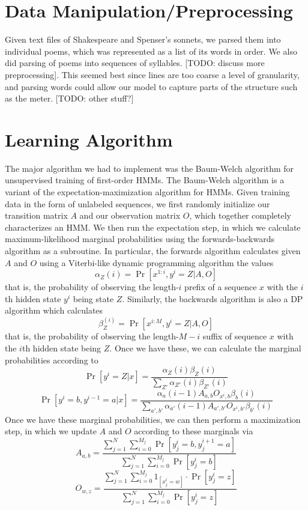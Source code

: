 \section{Data Manipulation/Preprocessing}
Given text files of Shakespeare and Spenser's sonnets, we parsed them into individual poems, which was represented as a list of its words in order. We also did parsing of poems into sequences of syllables. [TODO: discuss more preprocessing]. This seemed best since lines are too coarse a level of granularity, and parsing words could allow our model to capture parts of the structure such as the meter. [TODO: other stuff?]

\section{Learning Algorithm}
The major algorithm we had to implement was the Baum-Welch algorithm for unsupervised training of first-order HMMs. The Baum-Welch algorithm is a variant of the expectation-maximization algorithm for HMMs. Given training data in the form of unlabeled sequences, we first randomly initialize our transition matrix $A$ and our observation matrix $O$, which together completely characterizes an HMM. We then run the expectation step, in which we calculate maximum-likelihood marginal probabilities using the forwards-backwards algorithm as a subroutine. In particular, the forwards algorithm calculates given $A$ and $O$ using a Viterbi-like dynamic programming algorithm the values
$$\alpha_Z(i) = \Pr[x^{1 : i}, y^i = Z | A, O]$$
that is, the probability of observing the length-$i$ prefix of a sequence $x$ with the $i$th hidden state $y^i$ being state $Z$. Similarly, the backwards algorithm is also a DP algorithm which calculates
$$\beta_Z^(i) = \Pr[x^{i : M}, y^i = Z | A, O]$$
that is, the probability of observing the length-$M - i$ suffix of sequence $x$ with the $i$th hidden state being $Z$.
Once we have these, we can calculate the marginal probabilities according to
$$\Pr[y^i = Z | x] = \frac{\alpha_Z(i)\beta_Z(i)}{\sum_{Z'}{\alpha_{Z'}(i)\beta_{Z'}(i)}}$$
$$\Pr[y^i = b, y^{i - 1} = a | x] = \frac{\alpha_a(i - 1)A_{a, b}O_{x^i, b}\beta_b(i)}{\sum_{a', b'}{\alpha_{a'}(i - 1)A_{a', b'}O_{x^i, b'}\beta_{b'}(i)}}$$
Once we have these marginal probabilities, we can then perform a maximization step, in which we update $A$ and $O$ according to these marginals via
$$A_{a, b} = \frac{\sum_{j = 1}^{N}{\sum_{i = 0}^{M_j}{\Pr[y_j^i = b, y_j^{i + 1} = a]}}}{\sum_{j = 1}^{N}{\sum_{i = 0}^{M_j}{\Pr[y_j^i = b]}}}$$
$$O_{w, z} = \frac{\sum_{j = 1}^{N}{\sum_{i = 0}^{M_j}{1_{[x_j^i = w]} \cdot \Pr[y_j^i = z]}}}{\sum_{j = 1}^{N}{\sum_{i = 0}^{M_j}{\Pr[y_j^i = z]}}}$$
